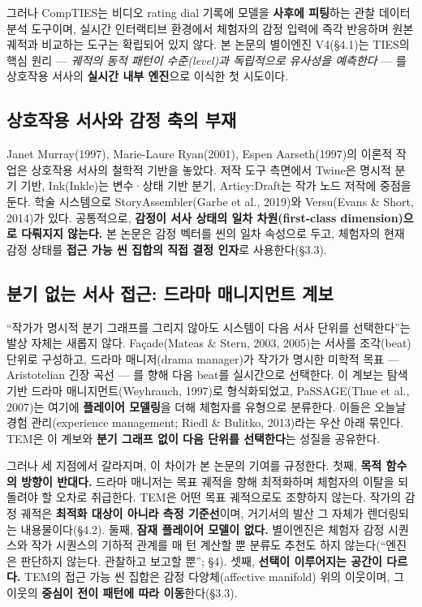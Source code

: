 \documentclass[11pt, a4paper]{article}
\begin{document}
그러나 CompTIES는 비디오 rating dial 기록에 모델을 \textbf{사후에 피팅}하는 관찰 데이터 분석 도구이며, 실시간 인터랙티브 환경에서 체험자의 감정 입력에 즉각 반응하며 원본 궤적과 비교하는 도구는 확립되어 있지 않다. 본 논문의 별이엔진 V4(\S4.1)는 TIES의 핵심 원리 --- \textit{궤적의 동적 패턴이 수준(level)과 독립적으로 유사성을 예측한다} --- 를 상호작용 서사의 \textbf{실시간 내부 엔진}으로 이식한 첫 시도이다.

\subsection{상호작용 서사와 감정 축의 부재}

Janet Murray(1997), Marie-Laure Ryan(2001), Espen Aarseth(1997)의 이론적 작업은 상호작용 서사의 철학적 기반을 놓았다. 저작 도구 측면에서 Twine은 명시적 분기 기반, Ink(Inkle)는 변수·상태 기반 분기, Articy:Draft는 작가 노드 저작에 중점을 둔다. 학술 시스템으로 StoryAssembler(Garbe et al., 2019)와 Versu(Evans \& Short, 2014)가 있다. 공통적으로, \textbf{감정이 서사 상태의 일차 차원(first-class dimension)으로 다뤄지지 않는다.} 본 논문은 감정 벡터를 씬의 일차 속성으로 두고, 체험자의 현재 감정 상태를 \textbf{접근 가능 씬 집합의 직접 결정 인자}로 사용한다(\S3.3).

\subsection{분기 없는 서사 접근: 드라마 매니지먼트 계보}

``작가가 명시적 분기 그래프를 그리지 않아도 시스템이 다음 서사 단위를 선택한다''는 발상 자체는 새롭지 않다. Façade(Mateas \& Stern, 2003, 2005)는 서사를 조각(beat) 단위로 구성하고, 드라마 매니저(drama manager)가 작가가 명시한 미학적 목표 --- Aristotelian 긴장 곡선 --- 를 향해 다음 beat를 실시간으로 선택한다. 이 계보는 탐색 기반 드라마 매니지먼트(Weyhrauch, 1997)로 형식화되었고, PaSSAGE(Thue et al., 2007)는 여기에 \textbf{플레이어 모델링}을 더해 체험자를 유형으로 분류한다. 이들은 오늘날 경험 관리(experience management; Riedl \& Bulitko, 2013)라는 우산 아래 묶인다. TEM은 이 계보와 \textbf{분기 그래프 없이 다음 단위를 선택한다}는 성질을 공유한다.

그러나 세 지점에서 갈라지며, 이 차이가 본 논문의 기여를 규정한다. 첫째, \textbf{목적 함수의 방향이 반대다.} 드라마 매니저는 목표 궤적을 향해 최적화하며 체험자의 이탈을 되돌려야 할 오차로 취급한다. TEM은 어떤 목표 궤적으로도 조향하지 않는다. 작가의 감정 궤적은 \textbf{최적화 대상이 아니라 측정 기준선}이며, 거기서의 발산 그 자체가 렌더링되는 내용물이다(\S4.2). 둘째, \textbf{잠재 플레이어 모델이 없다.} 별이엔진은 체험자 감정 시퀀스와 작가 시퀀스의 기하적 관계를 매 턴 계산할 뿐 분류도 추천도 하지 않는다(``엔진은 판단하지 않는다. 관찰하고 보고할 뿐''; \S4). 셋째, \textbf{선택이 이루어지는 공간이 다르다.} TEM의 접근 가능 씬 집합은 감정 다양체(affective manifold) 위의 이웃이며, 그 이웃의 \textbf{중심이 전이 패턴에 따라 이동}한다(\S3.3).
\end{document}
